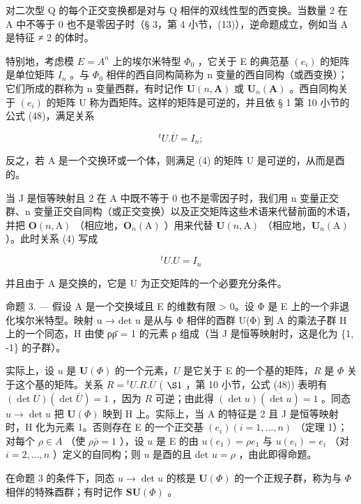 对二次型 Q 的每个正交变换都是对与 Q 相伴的双线性型的西变换。当数量 2 在 A 中不等于 0 也不是零因子时（§ 3，第 4 小节，(13)），逆命题成立，例如当 A 是特征 ≠ 2 的体时。

特别地，考虑模 \(E = A^{n}\) 上的埃尔米特型 \(\Phi_{0}\) ，它关于 E 的典范基 \((e_{i})\) 的矩阵是单位矩阵 \(I_{n}\) 。与 \(\Phi_{0}\) 相伴的西自同构简称为 n 变量的西自同构（或西变换）；它们所成的群称为 n 变量西群，有时记作 \(\mathbf{U}(n, \mathbf{A})\) 或 \(\mathbf{U}_{n}(\mathbf{A})\) 。西自同构关于 \((e_{i})\) 的矩阵 U 称为酉矩阵。这样的矩阵是可逆的，并且依 § 1 第 10 小节的公式 (48)，满足关系

\[
{ } ^ { t } U . \overline { { U } } = I _ { n } ;\tag{4}
\]

反之，若 A 是一个交换环或一个体，则满足 (4) 的矩阵 U 是可逆的，从而是酉的。

当 J 是恒等映射且 2 在 A 中既不等于 0 也不是零因子时，我们用 n 变量正交群、n 变量正交自同构（或正交变换）以及正交矩阵这些术语来代替前面的术语，并把 \(\mathbf{O}(n,\mathrm{A})\) （相应地，\(\mathbf{O}_n(\mathrm{A})\) ）用来代替 \(\mathbf{U}(n,\mathrm{A})\) （相应地，\(\mathbf{U}_n(\mathrm{A})\) ）。此时关系 (4) 写成

\[
{ } ^ { t } U . U = I _ { n }\tag{5}
\]

并且由于 A 是交换的，它是 U 为正交矩阵的一个必要充分条件。

命题 3. --- 假设 A 是一个交换域且 E 的维数有限 \textgreater{} 0。设 Φ 是 E 上的一个非退化埃尔米特型。映射 u → det u 是从与 Φ 相伴的酉群 U(Φ) 到 A 的乘法子群 H 上的一个同态，H 由使 ρρ̄ = 1 的元素 ρ 组成（当 J 是恒等映射时，这是化为 \{1, -1\} 的子群）。

实际上，设 \(u\) 是 \(\mathbf{U}(\Phi)\) 的一个元素，\(U\) 是它关于 E 的一个基的矩阵，\(R\) 是 \(\Phi\) 关于这个基的矩阵。关系 \(R = {}^t U.R.\overline{U}\) ( \(\S 1\) ，第 10 小节，公式 (48)) 表明有 \((\det U)(\det \overline{U}) = 1\) ，因为 \(R\) 可逆；由此得 \((\det u)(\overline{\det u}) = 1\) 。同态 \(u \to \det u\) 把 \(\mathbf{U}(\Phi)\) 映到 H 上。实际上，当 A 的特征是 2 且 J 是恒等映射时，H 化为元素 1。否则存在 E 的一个正交基 \((e_i)(i = 1,\ldots,n)\) （定理 1）；对每个 \(\rho \in A\) （使 \(\rho \bar{\rho} = 1\) ），设 \(u\) 是 E 的由 \(u(e_1) = \rho e_1\) 与 \(u(e_i) = e_i\) （对 \(i = 2,\ldots,n\) ）定义的自同构；则 \(u\) 是酉的且 det \(u = \rho\) ，由此即得命题。

在命题 3 的条件下，同态 \(u \to \det u\) 的核是 \(\mathbf{U}(\Phi)\) 的一个正规子群，称为与 \(\Phi\) 相伴的特殊酉群；有时记作 \(\mathbf{SU}(\Phi)\) 。

